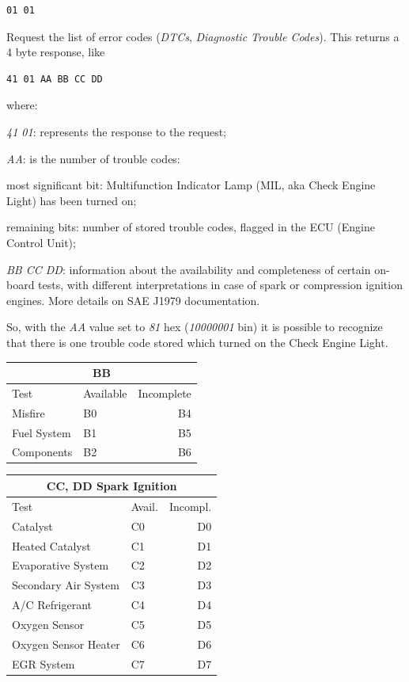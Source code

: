 \documentclass[twoside]{article}
\begin{document}
\begin{multicols}{2}
\begin{lstlisting}[language=bash]
01 01
\end{lstlisting}
Request the list of error codes (\emph{DTCs}, \emph{Diagnostic Trouble Codes}).
This returns a 4 byte response, like
\begin{lstlisting}[language=bash]
41 01 AA BB CC DD
\end{lstlisting}
where:
\begin{compactitem}
  \item \emph{41 01}: represents the response to the request;
  \item \emph{AA}: is the number of trouble codes:
  \begin{compactitem}
    \item most significant bit: Multifunction Indicator Lamp (MIL, aka Check Engine Light) has been turned on;
    \item remaining bits: number of stored trouble codes, flagged in the ECU (Engine Control Unit);
  \end{compactitem}
  \item \emph{BB CC DD}: information about the availability and completeness of certain on-board tests, with different interpretations in case of spark or compression ignition engines. More details on SAE J1979 documentation.
\end{compactitem}

So, with the \emph{AA} value set to \emph{81} hex (\emph{10000001} bin) it is possible to recognize that there is one trouble code stored which turned on the Check Engine Light.

\begin{table}[H]
\centering
\begin{tabular}{llr}
\multicolumn{3}{c}{BB} \\
\toprule
Test & Available & Incomplete \\
\midrule
Misfire & B0 & B4 \\          
Fuel System & B1 & B5 \\
Components & B2 & B6 \\
\bottomrule
\end{tabular}
\end{table}

\begin{table}[H]
\centering
\begin{tabular}{llr}
\multicolumn{3}{c}{CC, DD Spark Ignition} \\
\toprule
Test & Avail. & Incompl. \\
\midrule
Catalyst & C0 & D0 \\
Heated Catalyst & C1 & D1 \\
Evaporative System & C2 & D2 \\
Secondary Air System & C3 & D3 \\
A/C Refrigerant & C4 & D4 \\
Oxygen Sensor & C5 & D5 \\
Oxygen Sensor Heater & C6 & D6 \\
EGR System & C7 & D7 \\
\bottomrule
\end{tabular}
\end{table}


\end{multicols}
\end{document}
